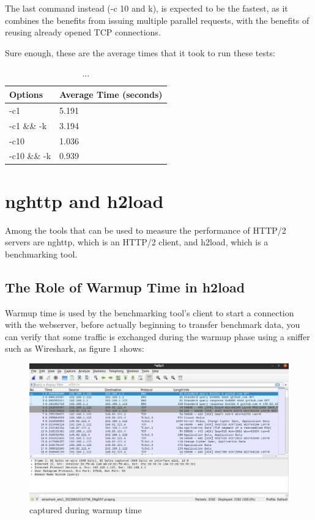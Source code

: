 \documentclass[a4paper,10pt]{article}
\begin{document}
The last command instead (-c 10 and k), is expected to be the fastest, as it combines the benefits from issuing multiple parallel requests, with the benefits of reusing already opened TCP connections.

Sure enough, these are the average times that it took to run these tests:




\begin{table}[h!]
\centering
\begin{tabular}{|l|l|}
\hline
Options      & Average Time (seconds) \\ \hline
-c1          & 5.191        \\ \hline
-c1 \&\& -k  & 3.194        \\ \hline
-c10         & 1.036        \\ \hline
-c10 \&\& -k & 0.939        \\ \hline



\end{tabular}

\caption{...}
\label{fig:table3}

\end{table}

\clearpage 


\section{nghttp and h2load}
Among the tools that can be used to measure the performance of HTTP/2 servers are nghttp, which is an HTTP/2 client, and h2load, which is a benchmarking tool.

\subsection{The Role of Warmup Time in h2load}

Warmup time is used by the benchmarking tool's client to start a connection with the 
webserver, before actually beginning to transfer benchmark data, you can verify that some traffic is exchanged during the warmup phase using a sniffer such as Wireshark, as figure 1 shows:

\begin{figure}[h!]
\centering
\includegraphics[scale=0.2]{h2load-wireshark}
\caption{captured during warmup time}
\label{fig:figure1}
\end{figure}
\end{document}
